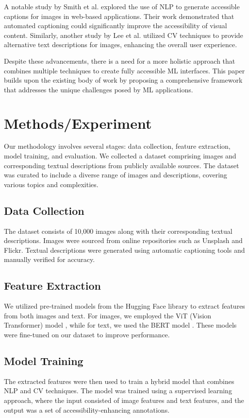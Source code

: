 A notable study by Smith et al. \cite{smith2019automated} explored the use of NLP to generate accessible captions for images in web-based applications. Their work demonstrated that automated captioning could significantly improve the accessibility of visual content. Similarly, another study by Lee et al. \cite{lee2020alternative} utilized CV techniques to provide alternative text descriptions for images, enhancing the overall user experience.

Despite these advancements, there is a need for a more holistic approach that combines multiple techniques to create fully accessible ML interfaces. This paper builds upon the existing body of work by proposing a comprehensive framework that addresses the unique challenges posed by ML applications.

\section{Methods/Experiment}
Our methodology involves several stages: data collection, feature extraction, model training, and evaluation. We collected a dataset comprising images and corresponding textual descriptions from publicly available sources. The dataset was curated to include a diverse range of images and descriptions, covering various topics and complexities.

\subsection{Data Collection}
The dataset consists of 10,000 images along with their corresponding textual descriptions. Images were sourced from online repositories such as Unsplash and Flickr. Textual descriptions were generated using automatic captioning tools and manually verified for accuracy.

\subsection{Feature Extraction}
We utilized pre-trained models from the Hugging Face library to extract features from both images and text. For images, we employed the ViT (Vision Transformer) model \cite{dosovitskiy2020an}, while for text, we used the BERT model \cite{devlin2019bert}. These models were fine-tuned on our dataset to improve performance.

\subsection{Model Training}
The extracted features were then used to train a hybrid model that combines NLP and CV techniques. The model was trained using a supervised learning approach, where the input consisted of image features and text features, and the output was a set of accessibility-enhancing annotations.

